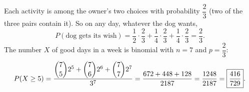 Each activity is among the owner's two choices with probability $\dfrac{2}{3}$ (two of the three pairs contain it). So on any day, whatever the dog wants,
\[P(\text{dog gets its wish})=\dfrac{1}{2}\cdot\dfrac{2}{3}+\dfrac{1}{4}\cdot\dfrac{2}{3}+\dfrac{1}{4}\cdot\dfrac{2}{3}=\dfrac{2}{3} .\]
The number $X$ of good days in a week is binomial with $n=7$ and $p=\dfrac{2}{3}$:
\[P(X\ge5)=\dfrac{\dbinom75 2^5+\dbinom76 2^6+\dbinom77 2^7}{3^7}=\dfrac{672+448+128}{2187}=\dfrac{1248}{2187}=\boxed{\dfrac{416}{729}}.\]
